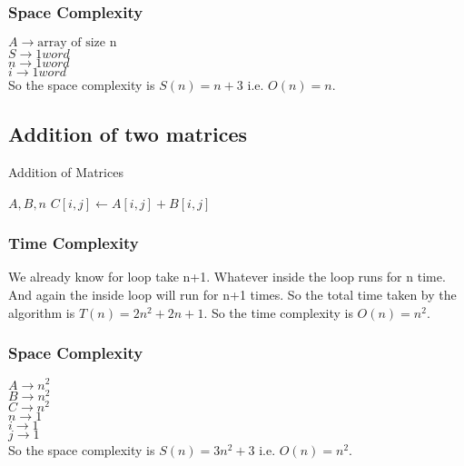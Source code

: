 \documentclass[]{article}
\begin{document}
\subsubsection{Space Complexity}
$A \rightarrow \text{array of size n}$ \\
$S \rightarrow 1 word$ \\
$n \rightarrow 1 word$ \\
$i \rightarrow 1 word$ \\
So the space complexity is $S(n) = n + 3$ i.e. $O(n) = n$.

\subsection{Addition of two matrices}
\noindent
\begin{algorithm}
    \caption{Addition of Matrices}\label{matadd}
    \begin{algorithmic}
     {$A, B, n$}
                \State $C[i, j] \gets A[i, j] + B[i, j]$ 
            \EndFor
        \EndFor
    \EndProcedure
    \end{algorithmic}
\end{algorithm}

\subsubsection{Time Complexity}
\noindent
We already know for loop take n+1. Whatever inside the loop runs for n time. And again the inside loop will run for n+1 times. So the total time taken by the algorithm is $T(n) = 2n^2 + 2n + 1$. So the time complexity is $O(n) = n^2$.

\subsubsection{Space Complexity}
\noindent
$A \rightarrow n^2$ \\
$B \rightarrow n^2$ \\
$C \rightarrow n^2$ \\
$n \rightarrow 1$ \\
$i \rightarrow 1$ \\
$j \rightarrow 1$ \\
So the space complexity is $S(n) = 3n^2 + 3$ i.e. $O(n) = n^2$.
\end{document}
